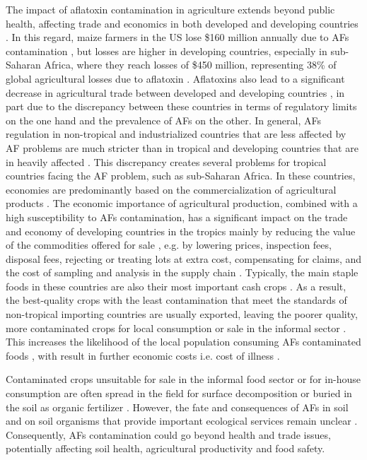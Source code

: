 The impact of aflatoxin contamination in agriculture extends beyond public health, affecting  trade and economics in both developed and developing countries \citep{jallow2021worldwide}. In this regard, maize farmers in the US lose \$160 million annually due to AFs contamination \citep{wu2015global}, but losses are higher in developing countries, especially in sub-Saharan Africa, where they reach losses of \$450 million, representing 38\% of global agricultural losses due to aflatoxin \citep{gbashi2018socio}. Aflatoxins also lead to a significant decrease in agricultural trade between developed and developing countries \citep{wu2015global}, in part due to the discrepancy between these countries in terms of regulatory limits on the one hand and the prevalence of AFs on the other. In general, AFs regulation in non-tropical and industrialized countries that are less affected by AF problems are much stricter than in tropical and developing countries that are in heavily affected \citep{sirma2018impacts}. This discrepancy creates several problems for tropical countries facing the AF problem, such as sub-Saharan Africa. In these countries, economies are predominantly based on the commercialization of agricultural products \citep{matumba2015concentrating}. The economic importance of agricultural production, combined with a high susceptibility to AFs contamination, has a significant impact on the trade and economy of developing countries in the tropics mainly by reducing the value of the commodities offered for sale \citep{jallow2021worldwide}, e.g. by lowering prices, inspection fees, disposal fees, rejecting or treating lots at extra cost, compensating for claims, and the cost of sampling and analysis in the supply chain \citep{gbashi2018socio}. Typically, the main staple foods in these countries are also their most important cash crops \citep{nji2022six}. As a result, the best-quality crops with the least contamination that meet the standards of non-tropical importing countries are usually exported, leaving the poorer quality, more contaminated crops for local consumption or sale in the informal sector \citep{matumba2015concentrating, nji2022six}. This increases the likelihood of the local population consuming AFs contaminated foods \citep{udomkun2017mycotoxins, nji2022six}, with result in further economic costs i.e. cost of illness \citep{meijer2021aflatoxin}.


Contaminated crops unsuitable for sale in the informal food sector or for in-house consumption are often spread in the field for surface decomposition or buried in the soil as organic fertilizer \citep{fouche2020aflatoxins}. However, the fate and consequences of AFs in soil and on soil organisms that provide important ecological services remain unclear \citep{fouche2020aflatoxins}. Consequently, AFs contamination could go beyond health and trade issues,  potentially affecting soil health, agricultural productivity and food safety.

